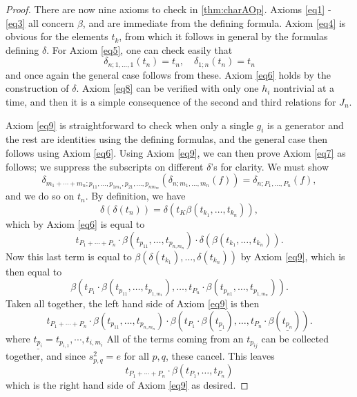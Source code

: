 \begin{proof}
There are now nine axioms to check in \cref{thm:charAOp}. Axioms \ref{eq1} - \ref{eq3} all concern $\beta$, and are immediate from the defining formula. Axiom \ref{eq4} is obvious for the elements $t_{k}$, from which it follows in general by the formulas defining $\delta$. For Axiom \ref{eq5}, one can check easily that
  \[
    \delta_{n; 1, \ldots, 1}(t_{n}) = t_{n}, \quad \delta_{1;n}(t_{n}) = t_{n}
  \]
and once again the general case follows from these. Axiom \ref{eq6} holds by the construction of $\delta$. Axiom \ref{eq8} can be verified with only one $h_{i}$ nontrivial at a time, and then it is a simple consequence of the second and third relations for $J_{n}$.

Axiom \ref{eq9} is straightforward to check when only a single $g_{i}$ is a generator and the rest are identities using the defining formulas, and the general case then follows using Axiom \ref{eq6}. Using Axiom \ref{eq9}, we can then prove Axiom \ref{eq7} as follows; we suppress the subscripts on different $\delta$'s for clarity. We must show
  \[
    \delta_{m_1 + \cdots + m_n; p_{11}, \ldots, p_{1m_{1}}, p_{21}, \ldots, p_{nm_{m}}}\left( \delta_{n; m_{1}, \ldots, m_{n}}(f) \right) = \delta_{n; P_{1}, \ldots, P_{n}}(f),
  \]
and we do so on $t_{n}$. By definition, we have
  \[
    \delta \left( \delta(t_{n}) \right) = \delta \left( t_{K} \beta(t_{k_{1}}, \ldots, t_{k_{n}}) \right),
  \]
which by Axiom \ref{eq6} is equal to
  \[
    t_{P_{1} + \cdots + P_{n}} \cdot \beta(t_{p_{11}}, \ldots, t_{p_{n,m_{n}}}) \cdot \delta\left( \beta(t_{k_{1}}, \ldots, t_{k_{n}}) \right).
  \]
Now this last term is equal to $\beta \left( \delta(t_{k_{1}}), \ldots, \delta(t_{k_{n}}) \right)$ by Axiom \ref{eq9}, which is then equal to
  \[
    \beta \left( t_{P_{1}}\cdot \beta(t_{p_{11}}, \ldots, t_{p_{1,m_{1}}}), \ldots,  t_{P_{n}}\cdot \beta(t_{p_{n1}}, \ldots, t_{p_{1,m_{n}}}) \right).
  \]
Taken all together, the left hand side of Axiom \ref{eq9} is then
  \[
    t_{P_{1} + \cdots + P_{n}} \cdot \beta(t_{p_{11}}, \ldots, t_{p_{n,m_{n}}}) \cdot \beta \left( t_{P_{1}}\cdot \beta(\underline{t_{p_{1}}}), \ldots,  t_{P_{n}}\cdot \beta(\underline{t_{p_{n}}}) \right).
  \]
where $\underline{t_{p_{i}}} = t_{p_{i,1}}, \cdots, t_{i,m_{i}}$
All of the terms coming from an $t_{p_{ij}}$ can be collected together, and since $s_{p,q}^{2} = e$ for all $p,q$, these cancel. This leaves
  \[
    t_{P_{1} + \cdots + P_{n}} \cdot \beta \left( t_{P_{1}}, \ldots,  t_{P_{n}} \right)
  \]
which is the right hand side of Axiom \ref{eq9} as desired.
\end{proof}

